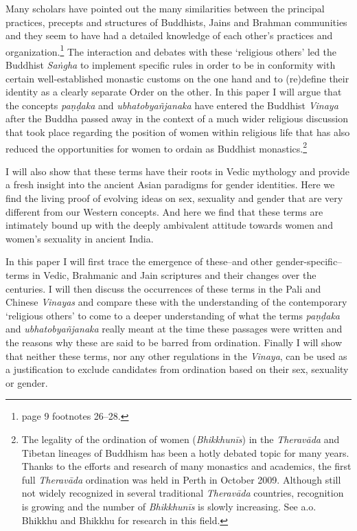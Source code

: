 Many scholars have pointed out the many similarities between the principal practices, precepts and structures of Buddhists, Jains and Brahman communities and they seem to have had a detailed knowledge of each other's practices and organization.\footnote{\cite{maes2016} page 9 footnotes 26–28.} The interaction and debates with these `religious others' led the Buddhist {\em Saṅgha} to implement specific rules in order to be in conformity with certain well-established monastic customs on the one hand and to (re)define their identity as a clearly separate Order on the other. In this paper I will argue that the concepts {\em paṇḍaka} and {\em ubhatob­yañ­janaka} have entered the Buddhist {\em Vinaya} after the Buddha passed away in the context of a much wider religious discussion that took place regarding the position of women within religious life that has also reduced the opportunities for women to ordain as Buddhist monastics.\footnote{The legality of the ordination of women ({\em Bhikkhunīs}) in the {\em Theravāda} and Tibetan lineages of Buddhism has been a hotly debated topic for many years. Thanks to the efforts and research of many monastics and academics, the first full {\em Theravāda} ordination was held in Perth in October 2009. Although still not widely recognized in several traditional {\em Theravāda} countries, recognition is growing and the number of {\em Bhikkhunīs} is slowly increasing. See a.o. Bhikkhu \cite{sujato2009} and Bhikkhu \cite{analayo2013} for research in this field.}

I will also show that these terms have their roots in Vedic mythology and provide a fresh insight into the ancient Asian paradigms for gender identities. Here we find the living proof of evolving ideas on sex, sexuality and gender that are very different from our Western concepts. And here we find that these terms are intimately bound up with the deeply ambivalent attitude towards women and women's sexuality in ancient India.

In this paper I will first trace the emergence of these--and other gender-specific--terms in Vedic, Brahmanic and Jain scriptures and their changes over the centuries. I will then discuss the occurrences of these terms in the Pali and Chinese {\em Vinayas} and compare these with the understanding of the contemporary `religious others' to come to a deeper understanding of what the terms {\em paṇḍaka} and {\em ubhatob­yañ­janaka} really meant at the time these passages were written and the reasons why these are said to be barred from ordination. Finally I will show that neither these terms, nor any other regulations in the {\em Vinaya}, can be used as a justification to exclude candidates from ordination based on their sex, sexuality or gender.

